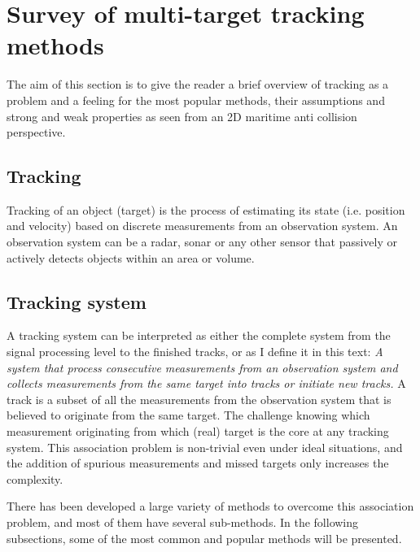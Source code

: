 
\section{Survey of multi-target tracking methods}
\label{sec:survey}
The aim of this section is to give the reader a brief overview of tracking as a problem and a feeling for the most popular methods, their assumptions and strong and weak properties as seen from an 2D maritime anti collision perspective.

\subsection{Tracking}
Tracking of an object (target) is the process of estimating its state (i.e. position and velocity) based on discrete measurements from an observation system. An observation system can be a radar, sonar or any other sensor that passively or actively detects objects within an area or volume.

\subsection{Tracking system}
A tracking system can be interpreted as either the complete system from the signal processing level to the finished tracks, or as I define it in this text: \emph{A system that process consecutive measurements from an observation system and collects measurements from the same target into tracks or initiate new tracks.} A track is a subset of all the measurements from the observation system that is believed to originate from the same target. The challenge knowing which measurement originating from which (real) target is the core at any tracking system. This association problem is non-trivial even under ideal situations, and the addition of spurious measurements and missed targets only increases the complexity.

There has been developed a large variety of methods to overcome this association problem, and most of them have several sub-methods. In the following subsections, some of the most common and popular methods will be presented.

